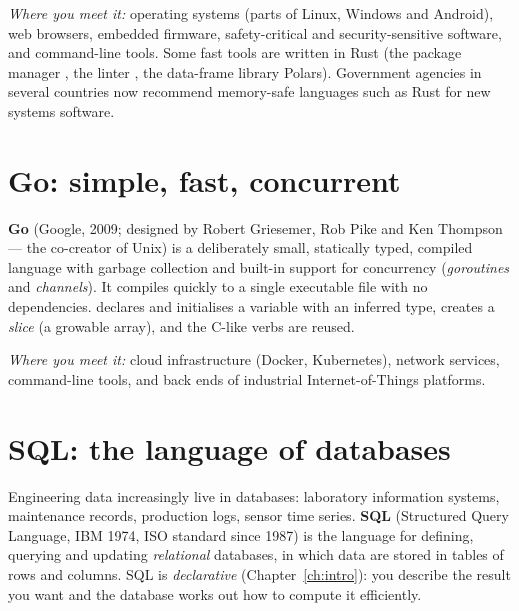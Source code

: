 \emph{Where you meet it:} operating systems (parts of Linux, Windows and Android), web
browsers, embedded firmware, safety-critical and security-sensitive software, and
command-line tools. Some fast \py tools are written in Rust (the package manager
, the linter , the data-frame library Polars). Government agencies in
several countries now recommend memory-safe languages such as Rust for new systems
software.

\section{Go: simple, fast, concurrent}

\textbf{Go} (Google, 2009; designed by Robert Griesemer, Rob Pike and Ken Thompson ---
the co-creator of Unix) is a deliberately small, statically typed, compiled language with
garbage collection and built-in support for concurrency (\emph{goroutines} and
\emph{channels}). It compiles quickly to a single executable file with no dependencies.
\code{:=} declares and initialises a variable with an inferred type,  creates a
\emph{slice} (a growable array), and the C-like  verbs are reused.

\emph{Where you meet it:} cloud infrastructure (Docker, Kubernetes), network services,
command-line tools, and back ends of industrial Internet-of-Things platforms.

\section{SQL: the language of databases}

Engineering data increasingly live in databases: laboratory information systems,
maintenance records, production logs, sensor time series. \textbf{SQL} (Structured Query
Language, IBM 1974, ISO standard since 1987) is the language for defining, querying and
updating \emph{relational} databases, in which data are stored in tables of rows and
columns. SQL is \emph{declarative} (Chapter~\ref{ch:intro}): you describe the result you
want and the database works out how to compute it efficiently.

